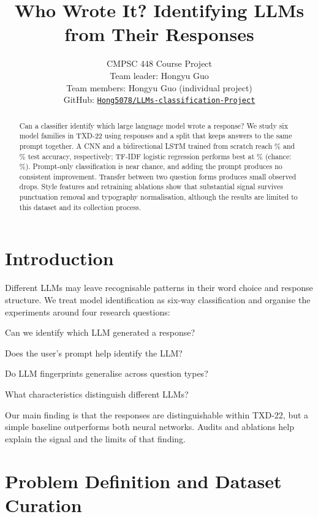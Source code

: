 \documentclass[11pt]{article}
\title{\vspace{-1.2cm}Who Wrote It? Identifying LLMs from Their Responses}
\author{CMPSC 448 Course Project\\[4pt]
Team leader: Hongyu Guo\\
Team members: Hongyu Guo (individual project)\\[4pt]
\small GitHub: \href{https://github.com/Hong5078/LLMs-classification-Project}{\texttt{Hong5078/LLMs-classification-Project}}}
\date{\vspace{-0.6cm}}
\begin{document}
\maketitle

\begin{abstract}
\noindent Can a classifier identify which large language model wrote a response? We study six model
families in TXD-22 using \SubsetRows{} responses and a split that keeps answers to the same prompt together.
A CNN and a bidirectional LSTM trained from scratch reach \RqOneCnnAcc\% and \RqOneLstmAcc\% test accuracy,
respectively; TF-IDF logistic regression performs best at \BaselineAcc\% (chance: \ChancePct\%).
Prompt-only classification is near chance, and adding the prompt produces no consistent improvement.
Transfer between two question forms produces small observed drops. Style features and retraining ablations
show that substantial signal survives punctuation removal and typography normalisation, although the results
are limited to this dataset and its collection process.
\end{abstract}

\section{Introduction}
Different LLMs may leave recognisable patterns in their word choice and response structure. We treat model
identification as six-way classification and organise the experiments around four research questions:
\begin{description}
\setlength{\itemsep}{0pt}
\setlength{\parskip}{0pt}
\item[RQ1:] Can we identify which LLM generated a response?
\item[RQ2:] Does the user's prompt help identify the LLM?
\item[RQ3:] Do LLM fingerprints generalise across question types?
\item[RQ4:] What characteristics distinguish different LLMs?
\end{description}
Our main finding is that the responses are distinguishable within TXD-22, but a simple baseline outperforms
both neural networks. Audits and ablations help explain the signal and the limits of that finding.

\section{Problem Definition and Dataset Curation}
\label{sec:data}
\end{document}
